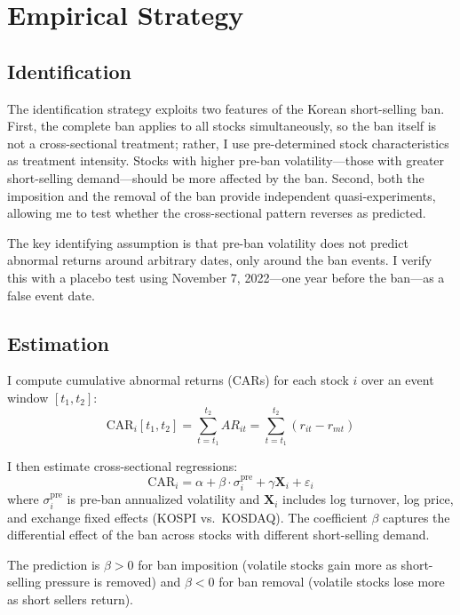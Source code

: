\documentclass[12pt]{article}
\begin{document}
\section{Empirical Strategy}
\label{sec:strategy}

\subsection{Identification}

The identification strategy exploits two features of the Korean short-selling ban. First, the complete ban applies to all stocks simultaneously, so the ban itself is not a cross-sectional treatment; rather, I use pre-determined stock characteristics as treatment intensity. Stocks with higher pre-ban volatility---those with greater short-selling demand---should be more affected by the ban. Second, both the imposition and the removal of the ban provide independent quasi-experiments, allowing me to test whether the cross-sectional pattern reverses as predicted.

The key identifying assumption is that pre-ban volatility does not predict abnormal returns around arbitrary dates, only around the ban events. I verify this with a placebo test using November 7, 2022---one year before the ban---as a false event date.

\subsection{Estimation}

I compute cumulative abnormal returns (CARs) for each stock $i$ over an event window $[t_1, t_2]$:
\begin{equation}
\text{CAR}_i[t_1, t_2] = \sum_{t=t_1}^{t_2} AR_{it} = \sum_{t=t_1}^{t_2} (r_{it} - r_{mt})
\end{equation}

I then estimate cross-sectional regressions:
\begin{equation}
\text{CAR}_i = \alpha + \beta \cdot \sigma_i^{\text{pre}} + \gamma \mathbf{X}_i + \varepsilon_i
\end{equation}
where $\sigma_i^{\text{pre}}$ is pre-ban annualized volatility and $\mathbf{X}_i$ includes log turnover, log price, and exchange fixed effects (KOSPI vs.\ KOSDAQ). The coefficient $\beta$ captures the differential effect of the ban across stocks with different short-selling demand.

The prediction is $\beta > 0$ for ban imposition (volatile stocks gain more as short-selling pressure is removed) and $\beta < 0$ for ban removal (volatile stocks lose more as short sellers return).
\end{document}
